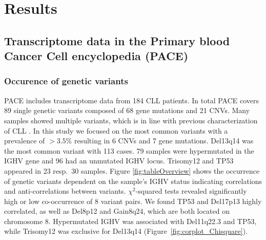 

\section{Results}

\subsection{Transcriptome data in the Primary blood Cancer Cell encyclopedia (PACE)} 

\subsubsection{Occurence of genetic variants}
PACE includes transcriptome data from 184 CLL patients. In total PACE covers 89 single genetic variants composed of 68 gene mutations and 21 CNVs. Many samples showed multiple variants, which is in line with previous characterization of CLL \citep{Landau2015}. In this study we focused on the most common variants with a prevalence of $> 3.5\%$ resulting in 6 CNVs and 7 gene mutations. Del13q14 was the most common variant with 113 cases. 79 samples were hypermutated in the IGHV gene and 96 had an unmutated IGHV locus. Trisomy12 and TP53 appeared in 23 resp.\ 30 samples.  Figure \ref{fig:tableOverview} shows the occurrence of genetic variants dependent on the sample's IGHV status indicating correlations and anti-correlations between variants. $\chi^2$-squared tests revealed significantly high or low co-occurrence of 8 variant pairs. We found TP53 and Del17p13 highly correlated, as well as Del8p12 and Gain8q24, which are both located on chromosome 8. Hypermutated IGHV was associated with Del11q22.3 and TP53, while Trisomy12 was exclusive for Del13q14 (Figure~\ref{fig:corplot_Chisquare}). 

%	


